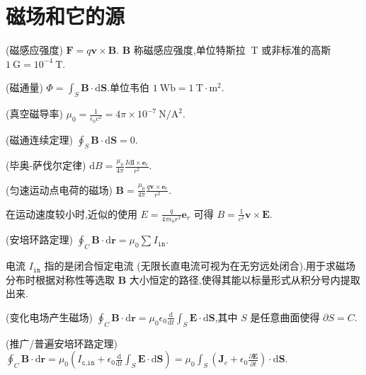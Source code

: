     \section{磁场和它的源}
    \begin{definition}
        (磁感应强度) $\bm{F}=q\bm{v}\times \bm{B}$. $\bm{B}$ 称磁感应强度,单位特斯拉 $\ \mathrm{T}$ 或非标准的高斯 $1 \ \mathrm{G}=10^{-4} \ \mathrm{T}$.
    \end{definition}
    \begin{definition}
        (磁通量) $\Phi=\int_{S}^{}\bm{B}\cdot \mathrm{d}\bm{S}$.单位韦伯 $1\ \mathrm{Wb}=1 \ \mathrm{T\cdot m^2}$.
    \end{definition}
    \begin{definition}
        (真空磁导率) $\mu_0=\frac{1}{\epsilon_0c^2}=4\pi \times 10^{-7} \ \mathrm{N / A^2}$.
    \end{definition}
    \begin{theorem}
        (磁通连续定理) $\oint_{S}^{}\bm{B}\cdot \mathrm{d}\bm{S}=0$.
    \end{theorem}
    \begin{theorem}
        (毕奥-萨伐尔定律) $\mathrm{d}B=\frac{\mu_0}{4\pi}\frac{I\mathrm{d}\bm{l}\times \bm{e}_{r}}{r^2}$.
    \end{theorem}
    \begin{theorem}
        (匀速运动点电荷的磁场) $\bm{B}=\frac{\mu_0}{4\pi}\frac{q \bm{v}\times \bm{e}_{r}}{r^2}$.
    \end{theorem}
    在运动速度较小时,近似的使用 $E=\frac{q}{4\pi\epsilon_0r^2}\bm{e}_{r}$ 可得 $B=\frac{1}{c^2}\bm{v}\times \bm{E}$.
    \begin{theorem}
        (安培环路定理) $\oint_{C}^{}\bm{B}\cdot \mathrm{d}\bm{r}=\mu_0\sum_{}^{}I_{\texttt{in}}$.
    \end{theorem}
    电流 $I_{\texttt{in}}$ 指的是闭合恒定电流 (无限长直电流可视为在无穷远处闭合).用于求磁场分布时根据对称性等选取 $\bm{B}$ 大小恒定的路径,使得其能以标量形式从积分号内提取出来.
    \begin{theorem}
        (变化电场产生磁场) $\oint_{C}^{}\bm{B}\cdot \mathrm{d}\bm{r}=\mu_0\epsilon_0 \frac{\mathrm{d}}{\mathrm{d}t}\int_{S}^{}\bm{E}\cdot \mathrm{d}\bm{S}$,其中 $S$ 是任意曲面使得 $\partial S=C$.
    \end{theorem}
    \begin{theorem}
        (推广/普遍安培环路定理) $\oint_{C}^{}\bm{B}\cdot \mathrm{d}\bm{r}=\mu_0\left( I_{\texttt{c,in}}+\epsilon_0 \frac{\mathrm{d}}{\mathrm{d}t}\int_{S}^{}\bm{E}\cdot \mathrm{d}\bm{S} \right) =\mu_0\int_{S}^{}\left( \bm{J}_{c}+\epsilon_0 \frac{\partial \bm{E}}{\partial t} \right) \cdot \mathrm{d}\bm{S}$.
    \end{theorem}
